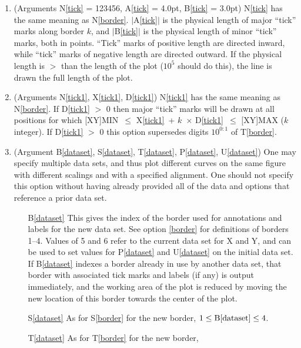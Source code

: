 \documentclass[twoside]{MATH77}
\begin{document}
\begin{multicols}{2}
\begin{enumerate}
\item\label{tick}  (Arguments N\ref{tick} = 123456, A\ref{tick} = 4.0pt,
        B\ref{tick} = 3.0pt) N\ref{tick} has the same meaning as
        N\ref{border}.  $|$A\ref{tick}$|$ is the physical length of major
        ``tick'' marks along border $k$, and $|$B\ref{tick}$|$ is the
        physical length of minor ``tick'' marks, both in points.
        ``Tick'' marks of positive length are directed inward, while
        ``tick'' marks of negative length are directed outward.  If the
        physical length is $>$ than the length of the plot ($10^5$ should
        do this), the line is drawn the full length of the plot.
 \item\label{tick1} (Arguments N\ref{tick1}, X\ref{tick1}, D\ref{tick1})
        N\ref{tick1} has the same meaning as N\ref{border}.  If
        D\ref{tick1} $>$ 0 then major ``tick'' marks will be drawn at all
        positions for which [XY]MIN~$\leq$ X\ref{tick1}~+ $k$~$\times$
        D\ref{tick1}~$\leq$ [XY]MAX ($k$ integer).  If D\ref{tick1} $>$ 0
        this option supersedes digits $10^{0:1}$ of T\ref{border}.
\item\label{dataset} (Argument B\ref{dataset}, S\ref{dataset},
        T\ref{dataset}, P\ref{dataset}, U\ref{dataset})
        One may specify multiple data sets, and thus plot different curves
        on the same figure with different scalings and with a specified
        alignment. One should not specify this option without having
        already provided all of the data and options that reference a
        prior data set.
        \begin{itemize}
        \item[B\ref{dataset}]  This gives the index
        of the border used for annotations and labels for the new data set.
        See option \ref{border} for definitions of borders 1--4.  Values
        of 5 and 6 refer to the current data set for X and Y, and can be
        used to set values for P\ref{dataset} and U\ref{dataset} on the
        initial data set.  If B\ref{dataset} indexes a border already in
        use by another data set, that border with associated tick marks
        and labels (if any) is output immediately, and the working area of
        the plot is reduced by moving the new location of this border
        towards the center of the plot.
        \item[S\ref{dataset}] As for S\ref{border} for the new border,
        $1 \leq \text{B\ref{dataset}} \leq 4$.
        \item[T\ref{dataset}] As for T\ref{border} for the new border,

\end{itemize}
\end{enumerate}
\end{multicols}
\end{document}
